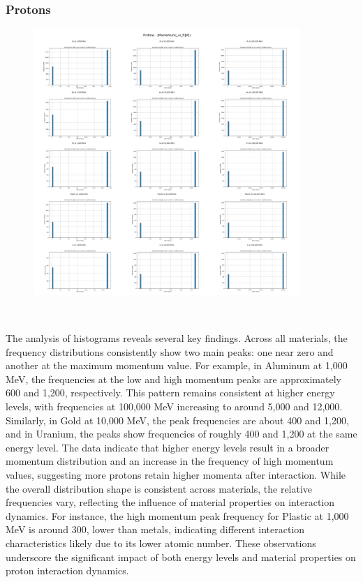 \documentclass{article}
\begin{document}
\subsubsection{Protons}

\begin{figure}[H]
\centering
\includegraphics[width=0.9\textwidth]{images/Combined Plots/|Momentum|_vs_f(|M|)_p.png}
\end{figure}\

\noindent The analysis of histograms reveals several key findings. Across all materials, the frequency distributions consistently show two main peaks: one near zero and another at the maximum momentum value. For example, in Aluminum at 1,000 MeV, the frequencies at the low and high momentum peaks are approximately 600 and 1,200, respectively. This pattern remains consistent at higher energy levels, with frequencies at 100,000 MeV increasing to around 5,000 and 12,000. Similarly, in Gold at 10,000 MeV, the peak frequencies are about 400 and 1,200, and in Uranium, the peaks show frequencies of roughly 400 and 1,200 at the same energy level. The data indicate that higher energy levels result in a broader momentum distribution and an increase in the frequency of high momentum values, suggesting more protons retain higher momenta after interaction. While the overall distribution shape is consistent across materials, the relative frequencies vary, reflecting the influence of material properties on interaction dynamics. For instance, the high momentum peak frequency for Plastic at 1,000 MeV is around 300, lower than metals, indicating different interaction characteristics likely due to its lower atomic number. These observations underscore the significant impact of both energy levels and material properties on proton interaction dynamics.
\end{document}
